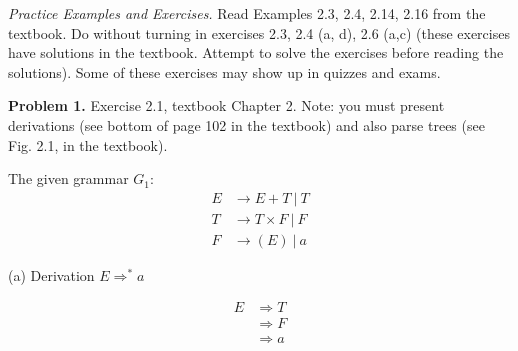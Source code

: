 \documentclass[12pt,letterpaper,final]{report}
\author{Jonathan Llovet}
\begin{document}

\vspace{0.5cm}


\emph{Practice Examples and Exercises.}  Read Examples 2.3, 2.4, 2.14, 2.16 from the textbook. Do without turning in exercises 2.3, 2.4 (a, d), 2.6 (a,c) (these exercises have solutions in the textbook. Attempt to solve the exercises before reading the solutions).  Some of these exercises may  show up in quizzes and exams.
\bigskip

\textbf{Problem 1.}  Exercise 2.1, textbook Chapter 2. Note: you must present derivations (see bottom of page 102 in the textbook) and also parse trees (see  Fig. 2.1, in the textbook).
\bigskip

The given grammar $G_1$:
\begin{align*}
  E & \to E + T\ \vert\ T      \\
  T & \to T \times F\ \vert\ F \\
  F & \to (E)\ \vert\ a
\end{align*}

\noindent(a) Derivation $E \Rightarrow^* a$

\medskip
\noindent
\begin{minipage}[t]{0.35\textwidth}
  \vspace{0pt}
  \begin{align*}
    E & \Rightarrow T \\
      & \Rightarrow F \\
      & \Rightarrow a \\
  \end{align*}
\end{minipage}%
\hfill
\begin{minipage}[t]{0.6\textwidth}
  \vspace{0pt}
  \centering
\end{minipage}
\end{document}
